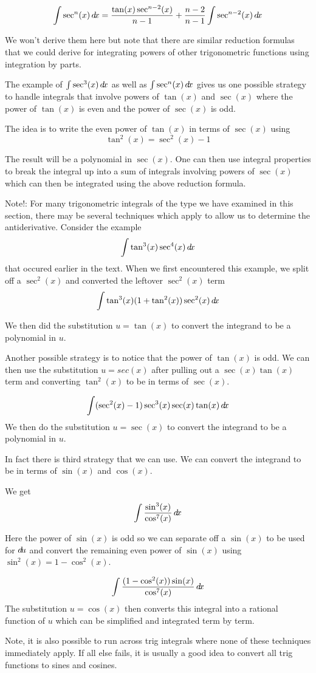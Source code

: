 \documentclass{ximera}
\begin{document}
\[
\int \sec^{n}(x) \mathop{}\!d\! x= \frac{\tan(x) \sec^{n-2}(x)}{n-1} + \frac{n-2}{n-1} \int \sec^{n-2}(x) \mathop{}\!d\! x 
\]

We won't derive them here but note that there are similar reduction formulas that we could derive for integrating powers of other trigonometric functions using integration by parts. 

The example of $\int \sec^{3}(x) \mathop{}\!d\! x$ as well as $\int \sec^{n}(x) \mathop{}\!d\! x$ gives us one possible strategy to handle integrals that involve powers of $\tan(x)$ and $\sec(x)$ 
where the power of $\tan(x)$ is even and the power of $\sec(x)$ is odd. 


The idea is to write the even power of $\tan(x)$ in terms of $\sec(x)$ using 
\[ 
\tan^{2}(x)=\sec^{2}(x)-1
\]

The result will be a polynomial in $\sec(x)$. 
One can then use integral properties to break the integral up into a sum of integrals involving powers of $\sec(x)$ which can then be integrated using 
the above reduction formula.  


Note!: For many trigonometric integrals of the type we have examined in this section, there may be several techniques which apply to allow us to 
determine the antiderivative.
Consider the example
\[
\int \tan^{3}(x) \sec^{4}(x) \mathop{}\!d\! x 
\]
that occured earlier in the text. When we first encountered this example, we split off a $\sec^{2}(x)$ and 
converted the leftover $\sec^{2}(x)$ term 
\[
\int \tan^{3}(x) (1+\tan^{2}(x)) \sec^{2}(x) \mathop{}\!d\! x
\]

We then did the substitution $u=\tan(x)$ to convert the integrand to be a polynomial in $u$. 

Another possible strategy is to notice that the power of $\tan(x)$ is odd.  We can then use the substitution $u=sec(x)$ after pulling out a $\sec(x)\tan(x)$ term and converting 
$\tan^2(x)$ to be in terms of $\sec(x)$. 

\[
\int (\sec^{2}(x)-1) \sec^{3}(x) \sec(x)\tan(x) \mathop{}\!d\! x
\]
We then do the substitution $u=\sec(x)$ to convert the integrand to be a polynomial in $u$. 

In fact there is third strategy that we can use. We  can convert the integrand to be in terms of $\sin(x)$ and $\cos(x)$. 

We get 
\[
\int \frac{\sin^{3}(x)}{\cos^{7 }(x) } \mathop{}\!d\! x
\]

Here the power of $\sin(x)$ is odd so we can separate off a $\sin(x)$ to be used for $\mathop{}\!d\! u$ and convert
the remaining even power of $\sin(x)$ using $\sin^{2}(x)=1-\cos^{2}(x)$. 

\[
\int \frac{(1-\cos^{2}(x)) \sin(x)}{\cos^{7}(x) } \mathop{}\!d\! x
\]
The substitution $u=\cos(x)$ then converts this integral into a rational function of $u$ which can be simplified and integrated 
term by term. 
\begin{remark}
Note, it is also possible to run across trig integrals where none of these techniques immediately apply.  If all else fails, it is usually a good idea to convert all trig functions to sines and cosines.
\end{remark}
\end{document}
